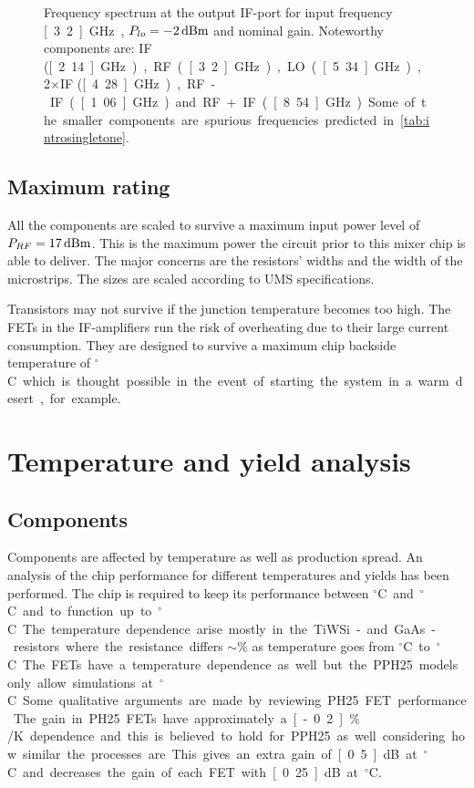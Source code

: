 			\begin{figure}[hbt!]
				\centering
				\caption[IF-port output spectrum.]{Frequency spectrum at the output IF-port for input frequency \unit[3.2]{GHz}, $P_{lo}=\unit[-2]{dBm}$ and nominal gain. Noteworthy components are: IF (\unit[2.14]{GHz}), RF (\unit[3.2]{GHz}), LO (\unit[5.34]{GHz}), 2$\times$IF (\unit[4.28]{GHz}), RF-IF (\unit[1.06]{GHz}) and RF+IF (\unit[8.54]{GHz}). Some of the smaller components are spurious frequencies predicted in \autoref{tab:introsingletone}.}\label{fig:sysspectrum}
			\end{figure}



		\subsection{Maximum rating}
			All the components are scaled to survive a maximum input power level of $P_{RF}=\unit[17]{dBm}$. This is the maximum power the circuit prior to this mixer chip is able to deliver. The major concerns are the resistors' widths and the width of the microstrips. The sizes are scaled according to UMS specifications.\autocite{pph25manual}

			Transistors may not survive if the junction temperature becomes too high. The FETs in the IF-amplifiers run the risk of overheating due to their large current consumption. They are designed to survive a maximum chip backside temperature of \unit[100]{$^\circ$C} which is thought possible in the event of starting the system in a warm desert, for example.

	\section{Temperature and yield analysis}
		\subsection{Components}
			Components are affected by temperature as well as production spread. An analysis of the chip performance for different temperatures and yields has been performed. The chip is required to keep its performance between \unit[-40]{$^\circ$C} and \unit[55]{$^\circ$C} and to function up to \unit[85]{$^\circ$C}.
			The temperature dependence arise mostly in the TiWSi- and GaAs-resistors where the resistance differs $\sim$\unit[10]{\%} as temperature goes from \unit[20]{$^\circ$C} to \unit[85]{$^\circ$C}. The FETs have a temperature dependence as well but the PPH25 models only allow simulations at \unit[20]{$^\circ$C}. Some qualitative arguments are made by reviewing PH25 FET performance. The gain in PH25 FETs have approximately a \unit[-0.2]{$\%$/K} dependence and this is believed to hold for PPH25 as well considering how similar the processes are. This gives an extra gain of \unit[0.5]{dB} at \unit[-40]{$^\circ$C} and decreases the gain of each FET with \unit[0.25]{dB} at \unit[55]{$^\circ$C}.

